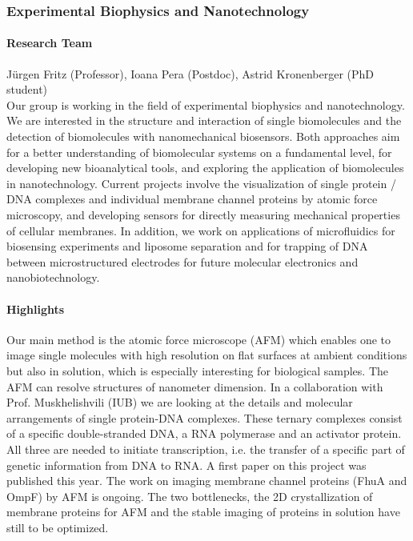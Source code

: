 \subsubsection{Experimental Biophysics and Nanotechnology }

\paragraph{Research Team}
J\"urgen Fritz (Professor), Ioana Pera (Postdoc), Astrid Kronenberger (PhD student)\\

Our group is working in the field of experimental biophysics and nanotechnology. We are interested in the structure and interaction of single biomolecules and the detection of biomolecules with nanomechanical biosensors.
Both approaches aim for a better understanding of biomolecular systems on a fundamental level, for developing new bioanalytical tools, and exploring the application of biomolecules in nanotechnology. Current projects involve the visualization of single protein / DNA complexes and individual membrane channel proteins by atomic force microscopy, and developing sensors for directly measuring mechanical properties of cellular membranes. In addition, we work on applications of microfluidics for biosensing experiments and liposome separation\cite{Fritz2} and for trapping of DNA between microstructured electrodes for future molecular electronics and nanobiotechnology.


\paragraph{Highlights}


Our main method is the atomic force microscope (AFM) which enables one to image single molecules with high resolution on flat surfaces at ambient conditions but also in solution, which is especially interesting for biological samples. The AFM can resolve structures of nanometer dimension. In a collaboration with Prof. Muskhelishvili (IUB) we are looking at the details and molecular arrangements of single protein-DNA complexes. These ternary complexes consist of a specific double-stranded DNA, a RNA polymerase and an activator protein. All three are needed to initiate transcription, i.e. the transfer of a specific part of genetic information from DNA to RNA. A first paper on this project was published this year\cite{Fritz1}. The work on imaging membrane channel proteins (FhuA and OmpF) by AFM is ongoing. The two bottlenecks, the 2D crystallization of membrane proteins for AFM and the stable imaging of proteins in solution have still to be optimized.

